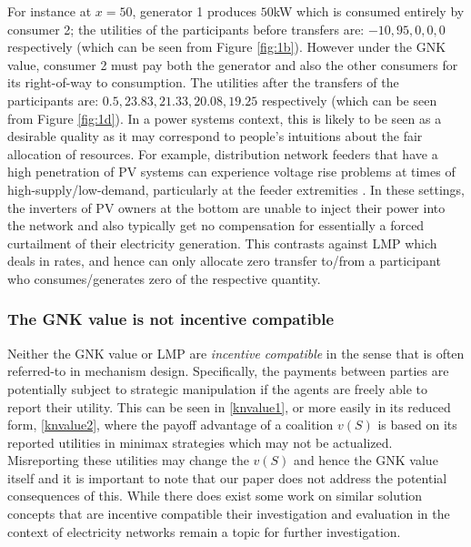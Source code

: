 For instance at $x=50$, generator 1 produces $50$kW
 which is consumed entirely by consumer 2; the utilities of the participants before transfers are: $-10, 95, 0, 0, 0$ respectively 
(which can be seen from Figure \ref{fig:1b}).
However under the GNK value, consumer 2 must pay both the generator and also the other consumers for its right-of-way to consumption.
The utilities after the transfers of the participants are: $0.5, 23.83, 21.33, 20.08, 19.25$ respectively (which can be seen from Figure \ref{fig:1d}).
In a power systems context, this is likely to be seen as a desirable quality as it may correspond to people's intuitions about the fair allocation of resources.
For example, distribution network feeders that have a high penetration of PV systems can experience voltage rise problems at 
times of high-supply/low-demand, particularly at the feeder extremities \cite{feeder1}. 
In these settings, the inverters of PV owners at the bottom are unable to inject their power into the network and also typically get no compensation for essentially a forced curtailment of their electricity generation.
This contrasts against LMP which deals in rates, and hence can only allocate zero transfer to/from a participant who consumes/generates zero of the respective quantity.

\subsubsection*{The GNK value is not incentive compatible}
Neither the GNK value or LMP are \emph{incentive compatible} in the sense that is often referred-to in mechanism design.
Specifically, the payments between parties are potentially subject to strategic manipulation if the agents are freely able to report their utility.\cite{8054716}
This can be seen in \eqref{knvalue1}, or more easily in its reduced form, \eqref{knvalue2}, where the payoff advantage  of a coalition $v(S)$ is based on its reported utilities in minimax strategies which may not be actualized.
Misreporting these utilities may change the $v(S)$ and hence the GNK value itself and it is important to note that our paper does not address the potential consequences of this.
While there does exist some work on similar solution concepts that are incentive compatible \cite{myerson1,Salamanca2019} their investigation and evaluation in the context of electricity networks remain a topic for further investigation.

